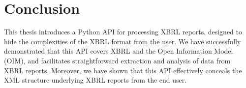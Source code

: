 \chapter{Conclusion}
\label{chapter:conclusion}

This thesis introduces a Python API for processing XBRL reports, designed to hide the complexities of the XBRL format from the user.
We have successfully demonstrated that this API covers XBRL and the Open Information Model (OIM),
and facilitates straightforward extraction and analysis of data from XBRL reports.
Moreover, we have shown that this API effectively conceals the XML structure underlying XBRL reports from the end user.



